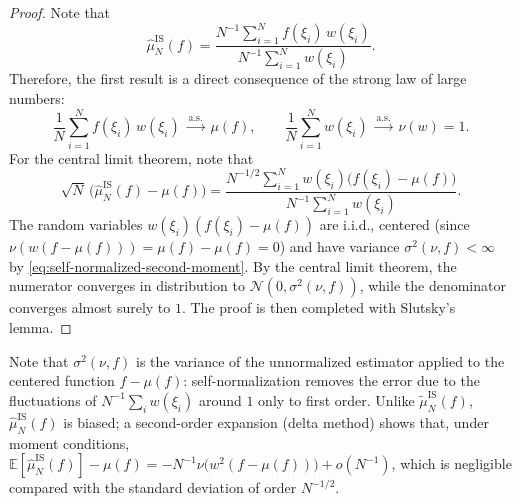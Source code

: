 \documentclass[english,graybox,envcountchap,envcountsame,sectrefs,shortlabels]{svmono}
\theoremstyle{style}
\newcommand{\eqsp}{}
\begin{document}
\begin{proof}
Note that
\[
\hat{\mu}^{\mathrm{IS}}_{N}(f)
=
\frac{N^{-1}\sum_{i=1}^N f(\xi_i)\,
w(\xi_i)}
{N^{-1}\sum_{i=1}^N
w(\xi_i)}\eqsp.
\]
Therefore, the first result is a direct consequence of the strong law of large numbers:
\[
\frac{1}{N}\sum_{i=1}^N f(\xi_i)\,w(\xi_i)
\;\xrightarrow{\text{a.s.}}\; \mu(f),
\qquad
\frac{1}{N}\sum_{i=1}^N w(\xi_i)
\;\xrightarrow{\text{a.s.}}\; \nu(w) = 1\eqsp.
\]
For the central limit theorem, note that
\[
\sqrt{N}\,\bigl(\hat{\mu}^{\mathrm{IS}}_{N}(f) - \mu(f)\bigr)
=
\frac{N^{-1/2}\sum_{i=1}^N w(\xi_i)
\bigl(f(\xi_i)-\mu(f)\bigr)}{N^{-1}\sum_{i=1}^N w(\xi_i)}\eqsp.
\]
The random variables $w(\xi_i)(f(\xi_i)-\mu(f))$ are i.i.d., centered (since $\nu(w(f-\mu(f))) = \mu(f)-\mu(f)=0$) and have variance $\sigma^2(\nu,f)<\infty$ by \eqref{eq:self-normalized-second-moment}. By the central limit theorem, the numerator converges in distribution to
$\mathcal{N}(0,\sigma^2(\nu,f))$, while the denominator converges almost surely
to $1$. The proof is then completed with Slutsky's lemma.
\end{proof}
Note that $\sigma^2(\nu,f)$ is the variance of the unnormalized estimator applied to the centered function $f-\mu(f)$: self-normalization removes the error due to the fluctuations of $N^{-1}\sum_i w(\xi_i)$ around $1$ only to first order. Unlike $\tilde\mu^{\mathrm{IS}}_N(f)$, $\hat\mu^{\mathrm{IS}}_N(f)$ is biased; a second-order expansion (delta method) shows that, under moment conditions, $\mathbb{E}[\hat\mu^{\mathrm{IS}}_N(f)]-\mu(f) = -N^{-1}\nu\big(w^2(f-\mu(f))\big) + o(N^{-1})$, which is negligible compared with the standard deviation of order $N^{-1/2}$.
\end{document}
